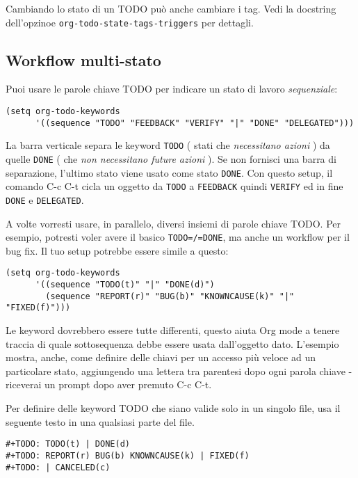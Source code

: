 \documentclass[11pt]{article}
\begin{document}
Cambiando lo stato di un TODO può anche cambiare i tag. Vedi la
docstring dell'opzinoe \texttt{org-todo-state-tags-triggers} per dettagli.

\subsection{Workflow multi-stato}
\label{sec:org10fc35f}
Puoi usare le parole chiave TODO per indicare un stato di lavoro
\emph{sequenziale}:

\begin{verbatim}
(setq org-todo-keywords
      '((sequence "TODO" "FEEDBACK" "VERIFY" "|" "DONE" "DELEGATED")))
\end{verbatim}

La barra verticale separa le keyword \texttt{TODO} ( stati che \emph{necessitano
azioni} ) da quelle \texttt{DONE} ( che \emph{non necessitano future azioni} ). Se
non fornisci una barra di separazione, l'ultimo stato viene usato come
stato \texttt{DONE}. Con questo setup, il comando C-c C-t cicla un
oggetto da \texttt{TODO} a \texttt{FEEDBACK} quindi \texttt{VERIFY} ed in fine \texttt{DONE} e
\texttt{DELEGATED}.

A volte vorresti usare, in parallelo, diversi insiemi di parole chiave
TODO. Per esempio, potresti voler avere il basico \texttt{TODO=/=DONE}, ma
anche un workflow per il bug fix. Il tuo setup potrebbe essere simile
a questo:

\begin{verbatim}
(setq org-todo-keywords
      '((sequence "TODO(t)" "|" "DONE(d)")
        (sequence "REPORT(r)" "BUG(b)" "KNOWNCAUSE(k)" "|" "FIXED(f)")))
\end{verbatim}

Le keyword dovrebbero essere tutte differenti, questo aiuta Org mode a
tenere traccia di quale sottosequenza debbe essere usata dall'oggetto
dato. L'esempio mostra, anche, come definire delle chiavi per un
accesso più veloce ad un particolare stato, aggiungendo una lettera
tra parentesi dopo ogni parola chiave - riceverai un prompt dopo aver
premuto C-c C-t.

Per definire delle keyword TODO che siano valide solo in un singolo
file, usa il seguente testo in una qualsiasi parte del file.

\begin{verbatim}
#+TODO: TODO(t) | DONE(d)
#+TODO: REPORT(r) BUG(b) KNOWNCAUSE(k) | FIXED(f)
#+TODO: | CANCELED(c)
\end{verbatim}
\end{document}
